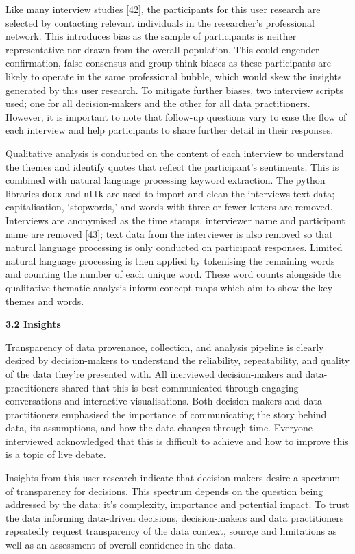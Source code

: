 \documentclass{article}
\begin{document}
Like many interview studies \protect\hyperlink{ref-futzing}{{[}42{]}},
the participants for this user research are selected by contacting
relevant individuals in the researcher's professional network. This
introduces bias as the sample of participants is neither representative
nor drawn from the overall population. This could engender confirmation,
false consensus and group think biases as these participants are likely
to operate in the same professional bubble, which would skew the
insights generated by this user research. To mitigate further biases,
two interview scripts used; one for all decision-makers and the other
for all data practitioners. However, it is important to note that
follow-up questions vary to ease the flow of each interview and help
participants to share further detail in their responses.

Qualitative analysis is conducted on the content of each interview to
understand the themes and identify quotes that reflect the participant's
sentiments. This is combined with natural language processing keyword
extraction. The python libraries \texttt{docx} and \texttt{nltk} are
used to import and clean the interviews text data; capitalisation,
`stopwords,' and words with three or fewer letters are removed.
Interviews are anonymised as the time stamps, interviewer name and
participant name are removed \protect\hyperlink{ref-jono}{{[}43{]}};
text data from the interviewer is also removed so that natural language
processing is only conducted on participant responses. Limited natural
language processing is then applied by tokenising the remaining words
and counting the number of each unique word. These word counts alongside
the qualitative thematic analysis inform concept maps which aim to show
the key themes and words.

\textbf{3.2 Insights}

Transparency of data provenance, collection, and analysis pipeline is
clearly desired by decision-makers to understand the reliability,
repeatability, and quality of the data they're presented with. All
inerviewed decision-makers and data-practitioners shared that this is
best communicated through engaging conversations and interactive
visualisations. Both decision-makers and data practitioners emphasised
the importance of communicating the story behind data, its assumptions,
and how the data changes through time. Everyone interviewed acknowledged
that this is difficult to achieve and how to improve this is a topic of
live debate.

Insights from this user research indicate that decision-makers desire a
spectrum of transparency for decisions. This spectrum depends on the
question being addressed by the data: it's complexity, importance and
potential impact. To trust the data informing data-driven decisions,
decision-makers and data practitioners repeatedly request transparency
of the data context, sourc,e and limitations as well as an assessment of
overall confidence in the data.
\end{document}
